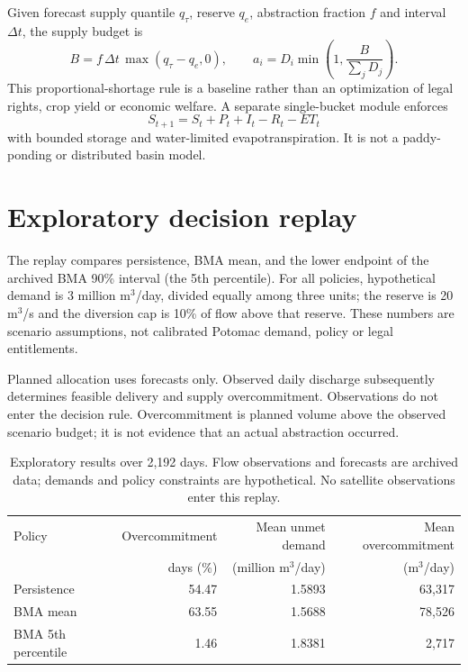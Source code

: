 \documentclass[11pt]{article}
\begin{document}
Given forecast supply quantile $q_\tau$, reserve $q_e$, abstraction fraction $f$ and interval $\Delta t$, the supply budget is
\begin{equation}
B=f\,\Delta t\,\max(q_\tau-q_e,0),\qquad
a_i=D_i\min\left(1,\frac{B}{\sum_jD_j}\right).
\end{equation}
This proportional-shortage rule is a baseline rather than an optimization of legal rights, crop yield or economic welfare. A separate single-bucket module enforces
\begin{equation}
S_{t+1}=S_t+P_t+I_t-R_t-ET_t
\end{equation}
with bounded storage and water-limited evapotranspiration. It is not a paddy-ponding or distributed basin model.

\section{Exploratory decision replay}
The replay compares persistence, BMA mean, and the lower endpoint of the archived BMA 90\% interval (the 5th percentile). For all policies, hypothetical demand is 3 million m$^3$/day, divided equally among three units; the reserve is 20 m$^3$/s and the diversion cap is 10\% of flow above that reserve. These numbers are scenario assumptions, not calibrated Potomac demand, policy or legal entitlements.

Planned allocation uses forecasts only. Observed daily discharge subsequently determines feasible delivery and supply overcommitment. Observations do not enter the decision rule. Overcommitment is planned volume above the observed scenario budget; it is not evidence that an actual abstraction occurred.

\begin{table}[ht]
\centering
\small
\begin{tabular}{lrrr}
\toprule
Policy & Overcommitment & Mean unmet demand & Mean overcommitment\\
 & days (\%) & (million m$^3$/day) & (m$^3$/day)\\
\midrule
Persistence & 54.47 & 1.5893 & 63,317\\
BMA mean & 63.55 & 1.5688 & 78,526\\
BMA 5th percentile & 1.46 & 1.8381 & 2,717\\
\bottomrule
\end{tabular}
\caption{Exploratory results over 2,192 days. Flow observations and forecasts are archived data; demands and policy constraints are hypothetical. No satellite observations enter this replay.}
\label{tab:replay}
\end{table}
\end{document}
